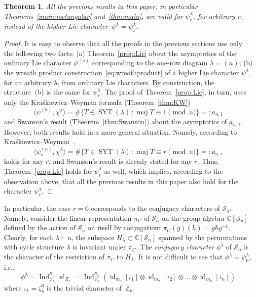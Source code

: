 \documentclass[12pt]%
{amsart}
\newcommand{\bbz}{\mathbb{Z}}
\renewcommand\S{{\mathcal S}}
\newcommand{\la}{{\lambda}}
\newcommand{\Ind}{\operatorname{Ind}}
\theoremstyle{plain}
\newtheorem{theorem}{Theorem}[section]
\theoremstyle{definition}
\theoremstyle{remark}
\newcommand{\id}{{\operatorname{id}}}
\def\CC{{\mathbb C}}
\begin{document}
\begin{theorem}\label{thm:conjugacy}
All 
the previous results in this paper, in particular Theorems~\ref{main:rectangular} and~\ref{thm:main},
are valid for $\psi_r^\la$, for arbitrary $r$, instead of the higher Lie character~$\psi^\la = \psi_1^\la$.
\end{theorem}
\begin{proof}
It is easy to observe that all the proofs in the previous sections use only the following two facts: 
(a) Theorem~\ref{prop:Lie} about the asymptotics of the ordinary Lie character $\psi^{(n)}$ corresponding to the one-row diagram $\la=(n)$; 
(b) the wreath product construction~\eqref{eq:wreathproduct} of a higher Lie character $\psi^\la$, for an arbitrary $\la$, from ordinary Lie characters. By construction, the structure~(b) is the same for $\psi_r^\la$. 
The proof of Theorem~\ref{prop:Lie}, in turn, uses only the Kra\'skiewicz--Weyman formula (Theorem~\ref{thm:KW})
\[
    \langle\psi^{(n)},\chi^\la\rangle
    =\#\{T\in\operatorname{SYT}(\la)\,\colon \operatorname{maj}T\equiv 1 \!\!\!\pmod n\} =: a_{n,1}
\]
    and Swanson's result (Theorem~\ref{thm:Swanson}) about the asymptotics of $a_{n,1}$. However, both results hold in a more general situation. Namely,  according to Kra\'skiewicz--Weyman~\cite[second corollary to Theorem 1]{KraskiewiczWeyman},
\[
    \langle\psi^{(n)}_r,\chi^\la\rangle=
    \#\{T\in\operatorname{SYT}(\la)\,\colon \operatorname{maj}T\equiv r \!\!\!\pmod n\} =: a_{n,r}
\]
holds for any $r$, 
and Swanson's result is already stated for any $r$. Thus, Theorem~\ref{prop:Lie} holds for $\psi_r^\la$ as well, which implies, according to the observation above, that all the previous results in this paper also hold for the character $\psi_r^\la$.
\end{proof}

In particular, the case $r=0$ corresponds to the conjugacy characters of $\S_n$. Namely, consider the linear
representation $\pi_C$ of $\S_n$ on the group algebra $\CC[\S_n]$ defined by the action of $\S_n$ on itself by conjugation: $\pi_C(g)(h)= ghg^{-1}$.
Clearly, for each $\la\vdash n$, the subspace $H_\la\subset\mathbb C[\S_n]$ spanned by the
permutations with cycle structure $\la$ is invariant under $\pi_C$. The {\em conjugacy character} $\phi^\la$ of $\S_n$ is the character of the restriction
of $\pi_C$ to $H_\la$. It is not difficult to see that
$\phi^\la=\psi_0^\la$, i.e.,
\[
    \phi^\la
    = \Ind_{Z_\la}^{\S_n}\id_{Z_\la}
    = \Ind_{Z_\la}^{\S_n}\left( \id_{m_1}[\iota_1] \otimes \id_{m_2}[\iota_2] \otimes \ldots \otimes \id_{m_n}[\iota_n] \right)
\]
where $\iota_k=\zeta_k^0$ is the trivial character of~$\bbz_k$.
\end{document}
